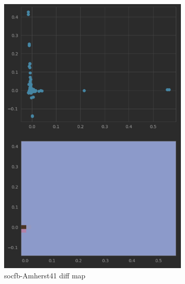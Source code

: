 \begin{figure}
    \begin{subfigure}{0.45\textwidth}
      \centering
      \includegraphics[width=\linewidth]{figures/real_diffmap_plot_nonuniformed.png}
      \caption{socfb-Amherst41 diff map}
      \label{fig:sub3}
    \end{subfigure}
    \hfill
    \begin{subfigure}{0.45\textwidth}
      \centering

\end{subfigure}
\end{figure}
